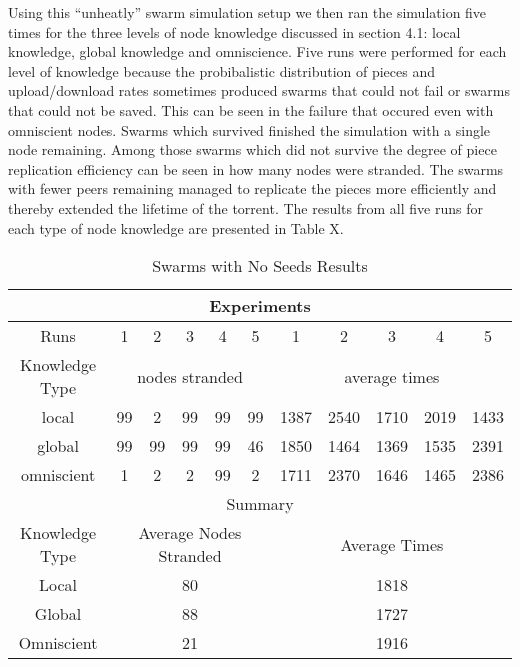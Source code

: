 Using this ``unheatly'' swarm simulation setup we then ran the
simulation five times for the three levels of node knowledge discussed
in section 4.1: local knowledge, global knowledge and
omniscience. Five runs were performed for each level of knowledge
because the probibalistic distribution of pieces and upload/download
rates sometimes produced swarms that could not fail or swarms that
could not be saved. This can be seen in the failure that occured even
with omniscient nodes. Swarms which survived finished the simulation
with a single node remaining. Among those swarms which did not survive
the degree of piece replication efficiency can be seen in how many
nodes were stranded. The swarms with fewer peers remaining managed to
replicate the pieces more efficiently and thereby extended the
lifetime of the torrent. The results from all five runs for each type
of node knowledge are presented in Table X.

\begin{table*}
\centering
\caption{Swarms with No Seeds Results}
\begin{tabular}{|c|c|c|c|c|c|c|c|c|c|c|} \hline
\multicolumn{11}{|c|}{Experiments}\\ \hline
Runs & 1 & 2 & 3 & 4 & 5 & 1 & 2 & 3 & 4 & 5\\ \hline
Knowledge Type & \multicolumn{5}{c|}{nodes stranded} & \multicolumn{5}{c|}{average times}\\ \hline
local      & 99&  2& 99& 99& 99&1387&2540&1710&2019&1433\\
global     & 99& 99& 99& 99& 46&1850&1464&1369&1535&2391\\
omniscient &  1&  2&  2& 99&  2&1711&2370&1646&1465&2386\\ \hline \hline
\multicolumn{11}{|c|}{Summary}\\ \hline
Knowledge Type & \multicolumn{5}{c|}{Average Nodes Stranded} & \multicolumn{5}{c|}{Average Times}\\ \hline
Local & \multicolumn{5}{c|}{80} & \multicolumn{5}{c|}{1818}\\
Global & \multicolumn{5}{c|}{88} & \multicolumn{5}{c|}{1727}\\
Omniscient & \multicolumn{5}{c|}{21} & \multicolumn{5}{c|}{1916}\\
\hline\end{tabular}
\label{tab:noseedresults}
\end{table*}


